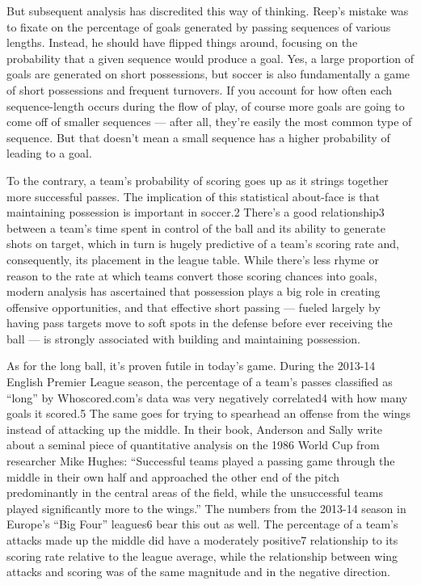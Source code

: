 But subsequent analysis has discredited this way of thinking. Reep’s mistake 
was to fixate on the percentage of goals generated by passing sequences of 
various lengths. Instead, he should have flipped things around, focusing on 
the probability that a given sequence would produce a goal. Yes, a large 
proportion of goals are generated on short possessions, but soccer is also 
fundamentally a game of short possessions and frequent turnovers. If you 
account for how often each sequence-length occurs during the flow of play, 
of course more goals are going to come off of smaller sequences — after all, 
they’re easily the most common type of sequence. But that doesn’t mean a 
small sequence has a higher probability of leading to a goal.

To the contrary, a team’s probability of scoring goes up as it strings together more successful passes. The implication of this statistical about-face is that maintaining possession is important in soccer.2 There’s a good relationship3 between a team’s time spent in control of the ball and its ability to generate shots on target, which in turn is hugely predictive of a team’s scoring rate and, consequently, its placement in the league table. While there’s less rhyme or reason to the rate at which teams convert those scoring chances into goals, modern analysis has ascertained that possession plays a big role in creating offensive opportunities, and that effective short passing — fueled largely by having pass targets move to soft spots in the defense before ever receiving the ball — is strongly associated with building and maintaining possession.

As for the long ball, it’s proven futile in today’s game. During the 2013-14 English Premier League season, the percentage of a team’s passes classified as “long” by Whoscored.com’s data was very negatively correlated4 with how many goals it scored.5
The same goes for trying to spearhead an offense from the wings instead of attacking up the middle. In their book, Anderson and Sally write about a seminal piece of quantitative analysis on the 1986 World Cup from researcher Mike Hughes: “Successful teams played a passing game through the middle in their own half and approached the other end of the pitch predominantly in the central areas of the field, while the unsuccessful teams played significantly more to the wings.” The numbers from the 2013-14 season in Europe’s “Big Four” leagues6 bear this out as well. The percentage of a team’s attacks made up the middle did have a moderately positive7 relationship to its scoring rate relative to the league average, while the relationship between wing attacks and scoring was of the same magnitude and in the negative direction.

